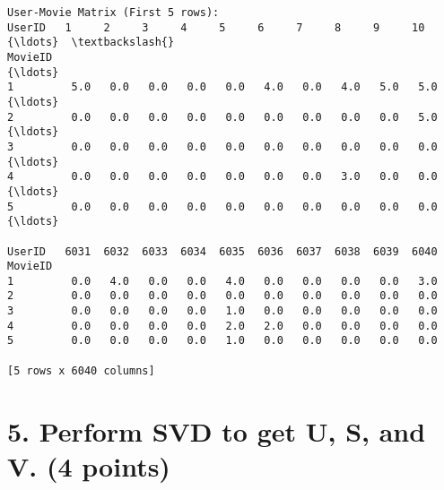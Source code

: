 \documentclass[11pt]{article}
\begin{document}
    \begin{Verbatim}[commandchars=\\\{\}]
User-Movie Matrix (First 5 rows):
UserID   1     2     3     4     5     6     7     8     9     10    {\ldots}  \textbackslash{}
MovieID                                                              {\ldots}
1         5.0   0.0   0.0   0.0   0.0   4.0   0.0   4.0   5.0   5.0  {\ldots}
2         0.0   0.0   0.0   0.0   0.0   0.0   0.0   0.0   0.0   5.0  {\ldots}
3         0.0   0.0   0.0   0.0   0.0   0.0   0.0   0.0   0.0   0.0  {\ldots}
4         0.0   0.0   0.0   0.0   0.0   0.0   0.0   3.0   0.0   0.0  {\ldots}
5         0.0   0.0   0.0   0.0   0.0   0.0   0.0   0.0   0.0   0.0  {\ldots}

UserID   6031  6032  6033  6034  6035  6036  6037  6038  6039  6040
MovieID
1         0.0   4.0   0.0   0.0   4.0   0.0   0.0   0.0   0.0   3.0
2         0.0   0.0   0.0   0.0   0.0   0.0   0.0   0.0   0.0   0.0
3         0.0   0.0   0.0   0.0   1.0   0.0   0.0   0.0   0.0   0.0
4         0.0   0.0   0.0   0.0   2.0   2.0   0.0   0.0   0.0   0.0
5         0.0   0.0   0.0   0.0   1.0   0.0   0.0   0.0   0.0   0.0

[5 rows x 6040 columns]
    \end{Verbatim}

    \section{5. Perform SVD to get U, S, and V. (4
points)}\label{perform-svd-to-get-u-s-and-v.-4-points}
\end{document}
